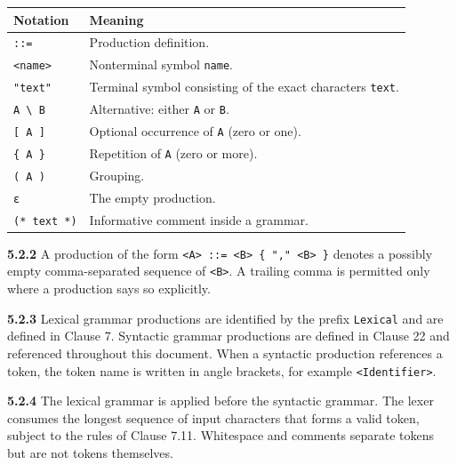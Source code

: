 \documentclass[
  english,
  11pt,
  a4paper,
]{article}
\begin{document}
\begin{longtable}[]{@{}
  >{\raggedright\arraybackslash}p{}
  >{\raggedright\arraybackslash}p{}@{}}
\toprule\noalign{}
\begin{minipage}[b]{\linewidth}\raggedright
Notation
\end{minipage} & \begin{minipage}[b]{\linewidth}\raggedright
Meaning
\end{minipage} \\
\midrule\noalign{}
\endhead
\bottomrule\noalign{}
\endlastfoot
\texttt{::=} & Production definition. \\
\texttt{\textless{}name\textgreater{}} & Nonterminal symbol
\texttt{name}. \\
\texttt{"text"} & Terminal symbol consisting of the exact characters
\texttt{text}. \\
\texttt{A\ \textbackslash{}\textbar{}\ B} & Alternative: either
\texttt{A} or \texttt{B}. \\
\texttt{{[}\ A\ {]}} & Optional occurrence of \texttt{A} (zero or
one). \\
\texttt{\{\ A\ \}} & Repetition of \texttt{A} (zero or more). \\
\texttt{(\ A\ )} & Grouping. \\
\texttt{ε} & The empty production. \\
\texttt{(*\ text\ *)} & Informative comment inside a grammar. \\
\end{longtable}

\textbf{5.2.2} A production of the form
\texttt{\textless{}A\textgreater{}\ ::=\ \textless{}B\textgreater{}\ \{\ ","\ \textless{}B\textgreater{}\ \}}
denotes a possibly empty comma-separated sequence of
\texttt{\textless{}B\textgreater{}}. A trailing comma is permitted only
where a production says so explicitly.

\textbf{5.2.3} Lexical grammar productions are identified by the prefix
\texttt{Lexical} and are defined in Clause 7. Syntactic grammar
productions are defined in Clause 22 and referenced throughout this
document. When a syntactic production references a token, the token name
is written in angle brackets, for example
\texttt{\textless{}Identifier\textgreater{}}.

\textbf{5.2.4} The lexical grammar is applied before the syntactic
grammar. The lexer consumes the longest sequence of input characters
that forms a valid token, subject to the rules of Clause 7.11.
Whitespace and comments separate tokens but are not tokens themselves.
\end{document}
